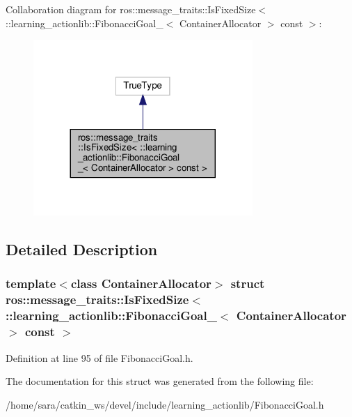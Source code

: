 Collaboration diagram for ros\+:\+:message\+\_\+traits\+:\+:Is\+Fixed\+Size$<$ \+:\+:learning\+\_\+actionlib\+:\+:Fibonacci\+Goal\+\_\+$<$ Container\+Allocator $>$ const $>$\+:
\nopagebreak
\begin{figure}[H]
\begin{center}
\leavevmode
\includegraphics[width=236pt]{structros_1_1message__traits_1_1IsFixedSize_3_01_1_1learning__actionlib_1_1FibonacciGoal___3_01C7285a8a0323ccb984b3c89e08586efeb}
\end{center}
\end{figure}


\subsection{Detailed Description}
\subsubsection*{template$<$class Container\+Allocator$>$\newline
struct ros\+::message\+\_\+traits\+::\+Is\+Fixed\+Size$<$ \+::learning\+\_\+actionlib\+::\+Fibonacci\+Goal\+\_\+$<$ Container\+Allocator $>$ const $>$}



Definition at line 95 of file Fibonacci\+Goal.\+h.



The documentation for this struct was generated from the following file\+:\begin{DoxyCompactItemize}
\item 
/home/sara/catkin\+\_\+ws/devel/include/learning\+\_\+actionlib/Fibonacci\+Goal.\+h\end{DoxyCompactItemize}

